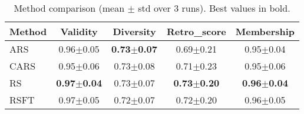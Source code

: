 \begin{table}[t]
\centering
\caption{Method comparison (mean $\pm$ std over 3 runs). Best values in bold.}
\label{tab:method_comparison}
\small
\begin{tabular}{lcccc}
\toprule
Method & Validity & Diversity & Retro_score & Membership \\
\midrule
ARS & 0.96$\pm$0.05 & \textbf{0.73$\pm$0.07} & 0.69$\pm$0.21 & 0.95$\pm$0.04 \\
CARS & 0.95$\pm$0.06 & 0.73$\pm$0.08 & 0.71$\pm$0.23 & 0.95$\pm$0.06 \\
RS & \textbf{0.97$\pm$0.04} & 0.73$\pm$0.07 & \textbf{0.73$\pm$0.20} & \textbf{0.96$\pm$0.04} \\
RSFT & 0.97$\pm$0.05 & 0.72$\pm$0.07 & 0.72$\pm$0.20 & 0.96$\pm$0.05 \\
\bottomrule
\end{tabular}
\end{table}
